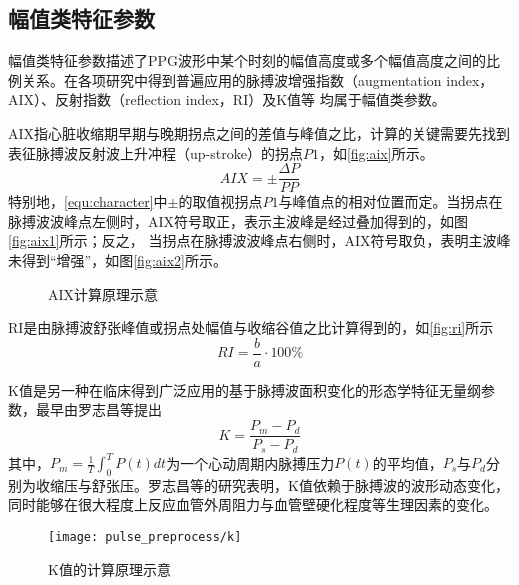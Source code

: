 \subsection{幅值类特征参数}

幅值类特征参数描述了PPG波形中某个时刻的幅值高度或多个幅值高度之间的比例关系。在各项研究中得到普遍应用的脉搏波增强指数（augmentation index，AIX）、反射指数（reflection index，RI）及K值等
均属于幅值类参数。

AIX指心脏收缩期早期与晚期拐点之间的差值与峰值之比，计算的关键需要先找到表征脉搏波反射波上升冲程（up-stroke）的拐点$P1$，如\autoref{fig:aix}所示\cite{Su2014}。
\begin{equation}
    \label{equ:aix}
    AIX = \pm \frac{\Delta P}{PP}
\end{equation}
特别地，\autoref{equ:character}中$\pm$的取值视拐点$P1$与峰值点的相对位置而定。当拐点在脉搏波波峰点左侧时，AIX符号取正，表示主波峰是经过叠加得到的，如图\autoref{fig:aix1}所示；反之，
当拐点在脉搏波波峰点右侧时，AIX符号取负，表明主波峰未得到“增强”，如图\autoref{fig:aix2}所示。
\begin{figure}[htbp]
    \centering
    \quad
    \caption[AIX计算原理示意]{\label{fig:aix}AIX计算原理示意\cite{Su2014}}
\end{figure}

RI是由脉搏波舒张峰值或拐点处幅值与收缩谷值之比计算得到的，如\autoref{fig:ri}所示\cite{Su2014,Elgendi2012}
\begin{equation}
    \label{equ:ri}
    RI = \frac{b}{a} \cdot 100\%
\end{equation}

K值是另一种在临床得到广泛应用的基于脉搏波面积变化的形态学特征无量纲参数，最早由罗志昌等\cite{Luo1988,PPGYY}提出
\begin{equation}
    \label{equ:ppgk}
    K=\frac{P_m-P_d}{P_s-P_d}
\end{equation}
其中，$P_m=\frac{1}{T}\int_{0}^{T}P(t)dt$为一个心动周期内脉搏压力$P(t)$的平均值，$P_s$与$P_d$分别为收缩压与舒张压。罗志昌等\cite{Luo1988,PPGYY}的研究表明，K值依赖于脉搏波的波形动态变化，
同时能够在很大程度上反应血管外周阻力与血管壁硬化程度等生理因素的变化。
\begin{figure}[htbp]
    \centering
    \texttt{[image: pulse\_preprocess/k]}
    \caption{\label{fig:k}K值的计算原理示意}
\end{figure}

